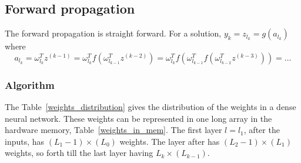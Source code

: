 \documentclass[final, paper=letter,5p,times,twocolumn]{elsarticle}
\begin{document}
\subsection{Forward propagation}

The forward propagation is straight forward. For a solution, $y_{k} = z_{l_{k}} = g(a_{l_{k}})$ where
$$
a_{l_{k}} = \omega_{l_{k}}^{T} z^{(k-1)} = \omega_{l_{k}}^{T} f(\omega_{l_{k-1}}^{T} z^{(k-2)}) = \omega_{l_{k}}^{T} f(\omega_{l_{k-1}}^{T} f(\omega_{l_{k-2}}^{T} z^{(k-3)})) = \dots
$$

\subsubsection{Algorithm}

The Table~\ref{weights_distribution} gives the distribution of the weights in a dense neural network. These weights can be represented in one long array in the hardware memory, Table~\ref{weights_in_mem}. The first layer $l = l_{1}$, after the inputs, has $(L_{1}-1)\times(L_{0})$ weights. The layer after has $(L_{2}-1)\times(L_{1})$ weights, so forth till the last layer having $L_{k}\times(L_{k-1})$.
\end{document}
